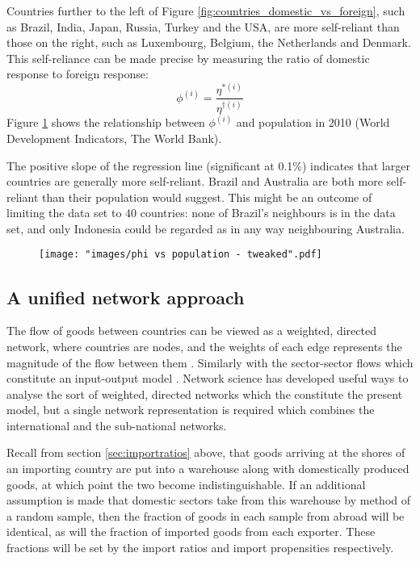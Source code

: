 \documentclass[a4paper]{article}
\begin{document}
Countries further to the left of Figure \ref{fig:countries_domestic_vs_foreign}, such as Brazil, India, Japan, Russia, Turkey and the USA, are more self-reliant than those on the right, such as Luxembourg, Belgium, the Netherlands and Denmark.
This self-reliance can be made precise by measuring the ratio of domestic response to foreign response:
\begin{equation}
\phi^{(i)} = \frac{\eta^{*(i)}}{\eta^{\dagger(i)}}
\end{equation}
Figure \ref{fig:phi-vs-pop} shows the relationship between $\phi^{(i)}$ and population in 2010 (World Development Indicators, The World Bank).

The positive slope of the regression line (significant at 0.1\%) indicates that larger countries are generally more self-reliant.
Brazil and Australia are both more self-reliant than their population would suggest.
This might be an outcome of limiting the data set to 40 countries: none of Brazil's neighbours is in the data set, and only Indonesia could be regarded as in any way neighbouring Australia.

\begin{figure}
\centering
\texttt{[image: "images/phi vs population - tweaked".pdf]}
\caption{}
\label{fig:phi-vs-pop}
\end{figure}



\subsection*{A unified network approach}
The flow of goods between countries can be viewed as a weighted, directed network, where countries are nodes, and the weights of each edge represents the magnitude of the flow between them \parencite{nystuen_graph_1961,serrano_topology_2003,bhattacharya_international_2008,baskaran_heckscher-ohlin_2011}.
Similarly with the sector-sector flows which constitute an input-output model \parencite{blochl_vertex_2011}.
Network science has developed useful ways to analyse the sort of weighted, directed networks which the constitute the present model, but a single network representation is required which combines the international and the sub-national networks.

Recall from section \ref{sec:importratios} above, that goods arriving at the shores of an importing country are put into a warehouse along with domestically produced goods, at which point the two become indistinguishable.
If an additional assumption is made that domestic sectors take from this warehouse by method of a random sample, then the fraction of goods in each sample from abroad will be identical, as will the fraction of imported goods from each exporter.
These fractions will be set by the import ratios and import propensities respectively.
\end{document}
